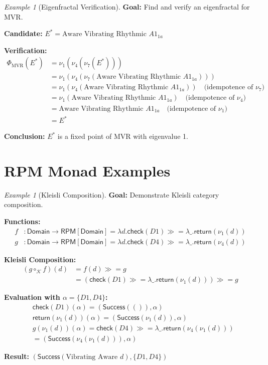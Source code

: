 \documentclass[11pt,twoside,openright]{book}
\theoremstyle{definition}
\theoremstyle{plain}
\theoremstyle{remark}
\newtheorem{example}[definition]{Example}
\newcommand{\noe}[1]{\nu_{#1}}
\newcommand{\rpmret}{\mathsf{return}}
\newcommand{\rpmbind}{\mathbin{\gg\!=}}
\newcommand{\Frac}{\Phi}
\newcommand{\Kleisli}{\mathcal{K}}
\begin{document}
\begin{example}[Eigenfractal Verification]
\label{ex:eigenfrac-verify}
\textbf{Goal:} Find and verify an eigenfractal for MVR.

\textbf{Candidate:} $E^* = \text{Aware Vibrating Rhythmic } A1_{1a}$

\textbf{Verification:}
\begin{align}
\Frac_{\text{MVR}}(E^*) &= \noe{1}(\noe{4}(\noe{7}(E^*))) \\
&= \noe{1}(\noe{4}(\noe{7}(\text{Aware Vibrating Rhythmic } A1_{1a}))) \\
&= \noe{1}(\noe{4}(\text{Aware Vibrating Rhythmic } A1_{1a})) \quad \text{(idempotence of } \noe{7}) \\
&= \noe{1}(\text{Aware Vibrating Rhythmic } A1_{1a}) \quad \text{(idempotence of } \noe{4}) \\
&= \text{Aware Vibrating Rhythmic } A1_{1a} \quad \text{(idempotence of } \noe{1}) \\
&= E^*
\end{align}

\textbf{Conclusion:} $E^*$ is a fixed point of MVR with eigenvalue 1.
\end{example}

\section{RPM Monad Examples}

\begin{example}[Kleisli Composition]
\label{ex:kleisli-comp}
\textbf{Goal:} Demonstrate Kleisli category composition.

\textbf{Functions:}
\begin{align}
f &: \mathsf{Domain} \to \mathsf{RPM}[\mathsf{Domain}] = \lambda d. \mathsf{check}(D1) \rpmbind \lambda\_. \rpmret(\noe{1}(d)) \\
g &: \mathsf{Domain} \to \mathsf{RPM}[\mathsf{Domain}] = \lambda d. \mathsf{check}(D4) \rpmbind \lambda\_. \rpmret(\noe{4}(d))
\end{align}

\textbf{Kleisli Composition:}
\begin{align}
(g \circ_\Kleisli f)(d) &= f(d) \rpmbind g \\
&= (\mathsf{check}(D1) \rpmbind \lambda\_. \rpmret(\noe{1}(d))) \rpmbind g
\end{align}

\textbf{Evaluation with $\alpha = \{D1, D4\}$:}
\begin{align}
&\mathsf{check}(D1)(\alpha) = (\mathsf{Success}(()), \alpha) \\
&\rpmret(\noe{1}(d))(\alpha) = (\mathsf{Success}(\noe{1}(d)), \alpha) \\
&g(\noe{1}(d))(\alpha) = \mathsf{check}(D4) \rpmbind \lambda\_. \rpmret(\noe{4}(\noe{1}(d))) \\
&= (\mathsf{Success}(\noe{4}(\noe{1}(d))), \alpha)
\end{align}

\textbf{Result:} $(\mathsf{Success}(\text{Vibrating Aware } d), \{D1, D4\})$
\end{example}
\end{document}
